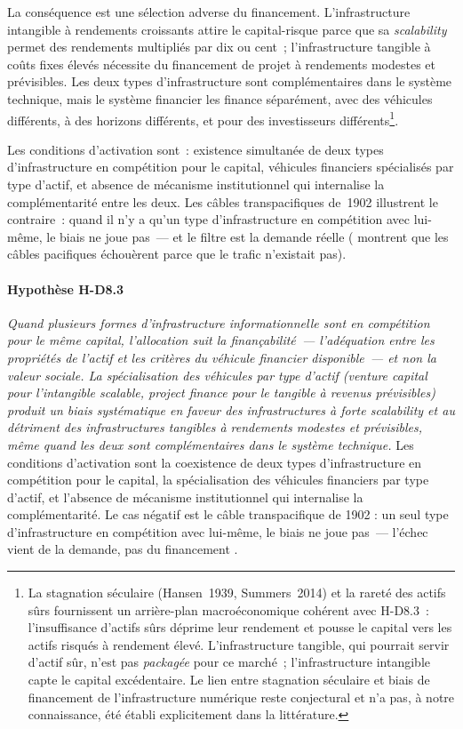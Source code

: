La conséquence est une sélection adverse du financement. L'infrastructure intangible à rendements croissants attire le capital-risque parce que sa \emph{scalability} permet des rendements multipliés par dix ou cent~; l'infrastructure tangible à coûts fixes élevés nécessite du financement de projet à rendements modestes et prévisibles. Les deux types d'infrastructure sont complémentaires dans le système technique, mais le système financier les finance séparément, avec des véhicules différents, à des horizons différents, et pour des investisseurs différents\footnote{La stagnation séculaire (Hansen~1939, Summers~2014) et la rareté des actifs sûrs \parencite{caballero_safe_2017} fournissent un arrière-plan macroéconomique cohérent avec H-D8.3~: l'insuffisance d'actifs sûrs déprime leur rendement et pousse le capital vers les actifs risqués à rendement élevé. L'infrastructure tangible, qui pourrait servir d'actif sûr, n'est pas \emph{packagée} pour ce marché~; l'infrastructure intangible capte le capital excédentaire. Le lien entre stagnation séculaire et biais de financement de l'infrastructure numérique reste conjectural et n'a pas, à notre connaissance, été établi explicitement dans la littérature.}.

Les conditions d'activation sont~: existence simultanée de deux types d'infrastructure en compétition pour le capital, véhicules financiers spécialisés par type d'actif, et absence de mécanisme institutionnel qui internalise la complémentarité entre les deux. Les câbles transpacifiques de~1902 illustrent le contraire~: quand il n'y a qu'un type d'infrastructure en compétition avec lui-même, le biais ne joue pas~--- et le filtre est la demande réelle (\textcite{muller_telegraph_2015} montrent que les câbles pacifiques échouèrent parce que le trafic n'existait pas).

\paragraph{Hypothèse H-D8.3} \emph{Quand plusieurs formes d'infrastructure informationnelle sont en compétition pour le même capital, l'allocation suit la \emph{finançabilité}~--- l'adéquation entre les propriétés de l'actif et les critères du véhicule financier disponible~--- et non la valeur sociale. La spécialisation des véhicules par type d'actif (\emph{venture capital} pour l'intangible scalable, \emph{project finance} pour le tangible à revenus prévisibles) produit un biais systématique en faveur des infrastructures à forte \emph{scalability} et au détriment des infrastructures tangibles à rendements modestes et prévisibles, même quand les deux sont complémentaires dans le système technique.} Les conditions d'activation sont la coexistence de deux types d'infrastructure en compétition pour le capital, la spécialisation des véhicules financiers par type d'actif, et l'absence de mécanisme institutionnel qui internalise la complémentarité. Le cas négatif est le câble transpacifique de 1902 : un seul type d'infrastructure en compétition avec lui-même, le biais ne joue pas~--- l'échec vient de la demande, pas du financement \parencite{muller_telegraph_2015}.


